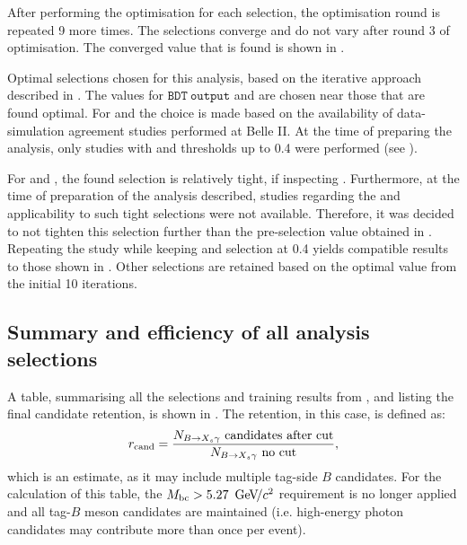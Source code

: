 After performing the optimisation for each selection, the optimisation round is repeated 9 more times.
The selections converge and do not vary after round 3 of optimisation.
The converged value that is found is shown in .

\begin{table}[htbp!]
    \centering
    \caption{\label{tab:interative_optimisation} Optimal selections chosen for this analysis, based on the iterative approach described in .
    The values for $\mathtt{BDT~output}$ and \ZMVA are chosen near those that are found optimal.
    For \piVeto and \etaVeto the choice is made based on the availability of data-simulation agreement studies performed at Belle II.
    At the time of preparing the analysis, 
    only studies with \piVeto and \etaVeto thresholds 
    up to 0.4 were performed (see ).
    }
    
\end{table}

For \piVeto and \etaVeto, the found selection is relatively tight, if inspecting .
Furthermore, at the time of preparation of the analysis described, studies regarding the \piVeto and \etaVeto applicability to such tight selections were not available.
Therefore, it was decided to not tighten this selection further than the pre-selection value obtained in .
Repeating the study while keeping \piVeto and \etaVeto selection at 0.4 yields compatible results to those shown in .
Other selections are retained based on the optimal value from the initial 10 iterations.

\subsection{Summary and efficiency of all analysis selections}\label{sec:selection_summary}

A table, summarising all the selections and \BDT training results from ,
and listing the final \BtoXsgamma candidate retention, is shown in .
The retention, in this case, is defined as:
\begin{equation}\label{eq:loose_efficiency}
    r_{\mathrm{cand}} = \frac{N_{\BtoXsgamma}~\mathrm{candidates~after~cut}}{N_{\BtoXsgamma}~\mathrm{no~cut}},
\end{equation}
which is an estimate, as it may include multiple tag-side $B$ candidates.
For the calculation of this table, the ${M_{\mathrm{bc}}}>5.27~{\mathrm{\,Ge\kern -0.1em V\!/}c^2}$ requirement is no longer applied and all tag-$B$ meson candidates are maintained (i.e. high-energy photon candidates may contribute more than once per event).

